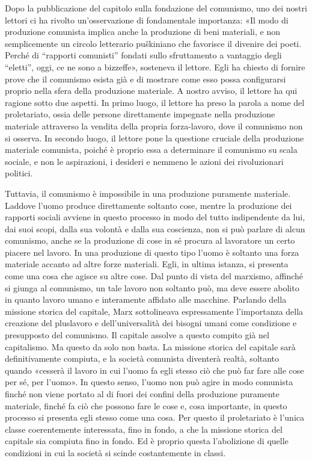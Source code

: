 \documentclass[../main]{subfiles}
\begin{document}
Dopo la pubblicazione del capitolo sulla fondazione del comunismo, uno dei nostri lettori ci ha rivolto un'osservazione di fondamentale importanza: «Il modo di produzione comunista implica anche la produzione di beni materiali, e non semplicemente un circolo letterario puškiniano che favorisce il divenire dei poeti. Perché di “rapporti comunisti” fondati sullo sfruttamento a vantaggio degli “eletti”, oggi, ce ne sono a bizzeffe», sosteneva il lettore. Egli ha chiesto di fornire prove che il comunismo esista già e di mostrare come esso possa configurarsi proprio nella sfera della produzione materiale. A nostro avviso, il lettore ha qui ragione sotto due aspetti. In primo luogo, il lettore ha preso la parola a nome del proletariato, ossia delle persone direttamente impegnate nella produzione materiale attraverso la vendita della propria forza-lavoro, dove il comunismo non si osserva. In secondo luogo, il lettore pone la questione cruciale della produzione materiale comunista, poiché è proprio essa a determinare il comunismo su scala sociale, e non le aspirazioni, i desideri e nemmeno le azioni dei rivoluzionari politici.

Tuttavia, il comunismo è impossibile in una produzione puramente materiale. Laddove l'uomo produce direttamente soltanto cose, mentre la produzione dei rapporti sociali avviene in questo processo in modo del tutto indipendente da lui, dai suoi scopi, dalla sua volontà e dalla sua coscienza, non si può parlare di alcun comunismo, anche se la produzione di cose in sé procura al lavoratore un certo piacere nel lavoro. In una produzione di questo tipo l'uomo è soltanto una forza materiale accanto ad altre forze materiali. Egli, in ultima istanza, si presenta come una cosa che agisce su altre cose. Dal punto di vista del marxismo, affinché si giunga al comunismo, un tale lavoro non soltanto può, ma deve essere abolito in quanto lavoro umano e interamente affidato alle macchine. Parlando della missione storica del capitale, Marx sottolineava espressamente l'importanza della creazione del pluslavoro e dell'universalità dei bisogni umani come condizione e presupposto del comunismo. Il capitale assolve a questo compito già nel capitalismo. Ma questo da solo non basta. La missione storica del capitale sarà definitivamente compiuta, e la società comunista diventerà realtà, soltanto quando «cesserà il lavoro in cui l'uomo fa egli stesso ciò che può far fare alle cose per sé, per l'uomo». In questo senso, l'uomo non può agire in modo comunista finché non viene portato al di fuori dei confini della produzione puramente materiale, finché fa ciò che possono fare le cose e, cosa importante, in questo processo si presenta egli stesso come una cosa. Per questo il proletariato è l'unica classe coerentemente interessata, fino in fondo, a che la missione storica del capitale sia compiuta fino in fondo. Ed è proprio questa l'abolizione di quelle condizioni in cui la società si scinde costantemente in classi.
\end{document}
